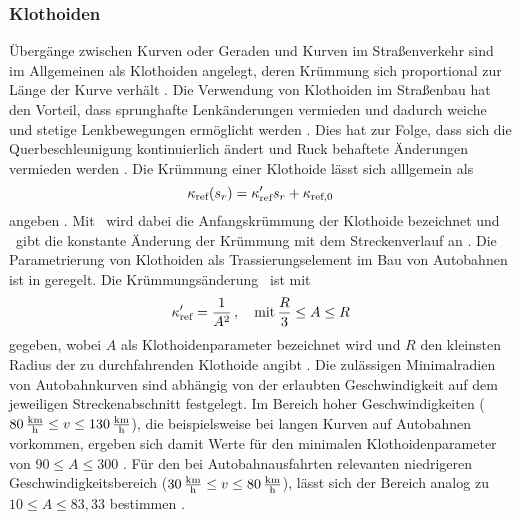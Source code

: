 \subsubsection{Klothoiden}\label{subsubsec:Klothoiden}
Übergänge zwischen Kurven oder Geraden und Kurven im Straßenverkehr sind im Allgemeinen als Klothoiden angelegt, deren Krümmung sich proportional zur Länge der Kurve verhält \cite{ForschungsgesellschaftfurStraenundVerkehrswesen.2008}. Die Verwendung von Klothoiden im Straßenbau hat den Vorteil, dass sprunghafte Lenkänderungen vermieden und dadurch weiche und stetige Lenkbewegungen ermöglicht werden \cite{ForschungsgesellschaftfurStraenundVerkehrswesen.2008}. Dies hat zur Folge, dass sich die Querbeschleunigung kontinuierlich ändert und Ruck behaftete Änderungen vermieden werden \cite{ForschungsgesellschaftfurStraenundVerkehrswesen.2008}. Die Krümmung einer Klothoide lässt sich alllgemein als 
\begin{equation}
	\kappa_{\textrm{ref}}(s_r) = \kappa'_{\textrm{ref}} s_r + \kappa_{\textrm{ref},0}
\end{equation}
angeben \cite{Rathgeber.2016}. Mit \kapparefzero~wird dabei die Anfangskrümmung der Klothoide bezeichnet und \dkapparef~gibt die konstante Änderung der Krümmung mit dem Streckenverlauf an \cite{Rathgeber.2016}. Die Parametrierung von Klothoiden als Trassierungselement im Bau von Autobahnen ist in \cite{ForschungsgesellschaftfurStraenundVerkehrswesen.2008} geregelt. Die Krümmungsänderung \dkapparef~ist mit 
\begin{equation}
	\kappa'_{\textrm{ref}} = \frac{1}{A^2}\,,\quad\textrm{mit}\, \frac{R}{3}\leq A\leq R
\end{equation}
gegeben, wobei $A$ als Klothoidenparameter bezeichnet wird und $R$ den kleinsten Radius der zu durchfahrenden Klothoide angibt \cite{ForschungsgesellschaftfurStraenundVerkehrswesen.2008}. Die zulässigen Minimalradien von Autobahnkurven sind abhängig von der erlaubten Geschwindigkeit auf dem jeweiligen Streckenabschnitt festgelegt. Im Bereich hoher Geschwindigkeiten ($80\,\mathrm{\frac{\mathrm{km}}{\mathrm{h}}}\leq v\leq 130\,\mathrm{\frac{\mathrm{km}}{\mathrm{h}}}$), die beispielsweise bei langen Kurven auf Autobahnen vorkommen, ergeben sich damit Werte für den minimalen Klothoidenparameter von $90\leq A\leq 300$ \cite{ForschungsgesellschaftfurStraenundVerkehrswesen.2008}. Für den bei Autobahnausfahrten relevanten niedrigeren Geschwindigkeitsbereich ($30\,\mathrm{\frac{\mathrm{km}}{\mathrm{h}}}\leq v\leq 80\,\mathrm{\frac{\mathrm{km}}{\mathrm{h}}}$), lässt sich der Bereich analog zu $10\leq A\leq 83,33$ bestimmen \cite{ForschungsgesellschaftfurStraenundVerkehrswesen.2008}.
 
